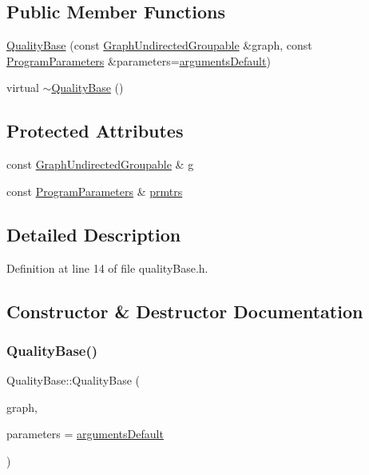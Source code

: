 \subsection*{Public Member Functions}
\begin{DoxyCompactItemize}
\item 
\hyperlink{classQualityBase_a4a337432378f43989fc127c74f661573}{Quality\+Base} (const \hyperlink{classGraphUndirectedGroupable}{Graph\+Undirected\+Groupable} \&graph, const \hyperlink{structProgramParameters}{Program\+Parameters} \&parameters=\hyperlink{program_8h_ae2d819404495f80f31db7676c1329d19}{arguments\+Default})
\item 
virtual \hyperlink{classQualityBase_a28a1db64a80d984a07fec631714c3e6f}{$\sim$\+Quality\+Base} ()
\end{DoxyCompactItemize}
\subsection*{Protected Attributes}
\begin{DoxyCompactItemize}
\item 
const \hyperlink{classGraphUndirectedGroupable}{Graph\+Undirected\+Groupable} \& \hyperlink{classQualityBase_a0de27470f02f01671fcb17543f235758}{g}
\item 
const \hyperlink{structProgramParameters}{Program\+Parameters} \& \hyperlink{classQualityBase_a02bb6bd03a001360b57de99f3d18fba3}{prmtrs}
\end{DoxyCompactItemize}


\subsection{Detailed Description}


Definition at line 14 of file quality\+Base.\+h.



\subsection{Constructor \& Destructor Documentation}
\mbox{\label{classQualityBase_a4a337432378f43989fc127c74f661573}} 
\subsubsection{\texorpdfstring{Quality\+Base()}{QualityBase()}}
{\footnotesize\ttfamily Quality\+Base\+::\+Quality\+Base (\begin{DoxyParamCaption}\item[{const \hyperlink{classGraphUndirectedGroupable}{Graph\+Undirected\+Groupable} \&}]{graph,  }\item[{const \hyperlink{structProgramParameters}{Program\+Parameters} \&}]{parameters = {\ttfamily \hyperlink{program_8h_ae2d819404495f80f31db7676c1329d19}{arguments\+Default}} }\end{DoxyParamCaption})\hspace{0.3cm}{\ttfamily [inline]}}

